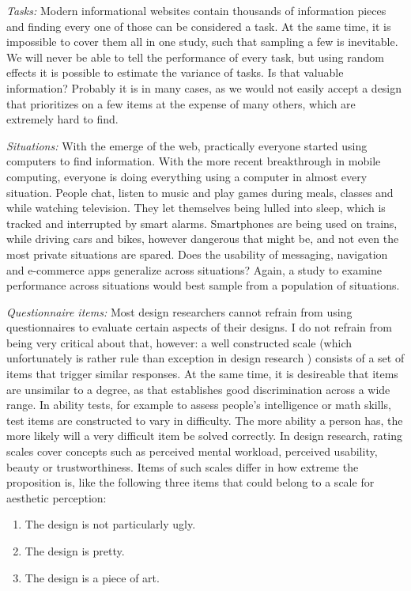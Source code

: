 \documentclass[]{svmono}
\providecommand{\tightlist}{%
  \setlength{\itemsep}{0pt}\setlength{\parskip}{0pt}}
\begin{document}
\emph{Tasks:} Modern informational websites contain thousands of
information pieces and finding every one of those can be considered a
task. At the same time, it is impossible to cover them all in one study,
such that sampling a few is inevitable. We will never be able to tell
the performance of every task, but using random effects it is possible
to estimate the variance of tasks. Is that valuable information?
Probably it is in many cases, as we would not easily accept a design
that prioritizes on a few items at the expense of many others, which are
extremely hard to find.

\emph{Situations:} With the emerge of the web, practically everyone
started using computers to find information. With the more recent
breakthrough in mobile computing, everyone is doing everything using a
computer in almost every situation. People chat, listen to music and
play games during meals, classes and while watching television. They let
themselves being lulled into sleep, which is tracked and interrupted by
smart alarms. Smartphones are being used on trains, while driving cars
and bikes, however dangerous that might be, and not even the most
private situations are spared. Does the usability of messaging,
navigation and e-commerce apps generalize across situations? Again, a
study to examine performance across situations would best sample from a
population of situations.

\emph{Questionnaire items:} Most design researchers cannot refrain from
using questionnaires to evaluate certain aspects of their designs. I do
not refrain from being very critical about that, however: a well
constructed scale (which unfortunately is rather rule than exception in
design research ) consists of a set of items that trigger similar
responses. At the same time, it is desireable that items are unsimilar
to a degree, as that establishes good discrimination across a wide
range. In ability tests, for example to assess people's intelligence or
math skills, test items are constructed to vary in difficulty. The more
ability a person has, the more likely will a very difficult item be
solved correctly. In design research, rating scales cover concepts such
as perceived mental workload, perceived usability, beauty or
trustworthiness. Items of such scales differ in how extreme the
proposition is, like the following three items that could belong to a
scale for aesthetic perception:

\begin{enumerate}
\def\labelenumi{\arabic{enumi}.}
\tightlist
\item
  The design is not particularly ugly.
\item
  The design is pretty.
\item
  The design is a piece of art.
\end{enumerate}
\end{document}
